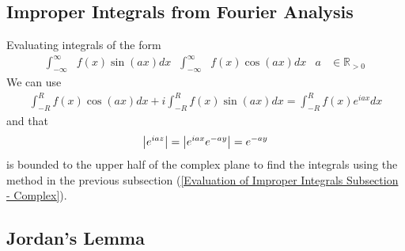 \documentclass[12pt, english]{book}
\begin{document}
	\subsection{Improper Integrals from Fourier Analysis} \label{Improper Integrals from Fourier Analysis Subsection - Complex}
	
	Evaluating integrals of the form
	\begin{align*}
		\int_{-\infty}^{\infty} &f(x) \sin(ax) dx &
		\int_{-\infty}^{\infty} &f(x) \cos(ax) dx &
		a &\in \mathbb{R}_{>0}
	\end{align*}
	We can use 
	\begin{align*}
		\int_{-R}^{R} f(x) \cos(ax) dx + i \int_{-R}^{R} f(x) \sin(ax) dx 
		= \int_{-R}^{R} f(x) e^{iax} dx
	\end{align*}
	and that 
	\begin{align*}
		\abs{e^{iaz}} = \abs{e^{iax} e^{-ay}} = e^{-ay}
	\end{align*}
	is bounded to the upper half of the complex plane to find the integrals using the method in the previous subsection (\cref{Evaluation of Improper Integrals Subsection - Complex}).
	
	\subsection{Jordan's Lemma} \label{Jordan's Lemma Subsection - Complex}
	
\end{document}
